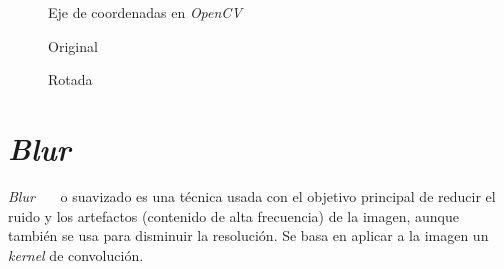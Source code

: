 \begin{figure}[H]
  \caption{Eje de coordenadas en \emph{OpenCV}}
  \centering \setlength\fboxsep{0pt} \setlength\fboxrule{0.5pt}
\end{figure}

\begin{figure}[H]
  \caption{Original}
  \centering \setlength\fboxsep{0pt} \setlength\fboxrule{0.5pt}
\end{figure}

\begin{figure}[H]
  \centering \setlength\fboxsep{0pt} \setlength\fboxrule{0.5pt}
  \caption{Rotada}
\end{figure}

\section{\emph{Blur}}
\emph{Blur}~\emph{\citep*[Smoothing]{opencv_book-bib}}~\emph{\citep*[3.3.1
  Non-linear filtering]{szeliski2010computer}}~\emph{\citep*[4.3 Noise
  Reduction]{toennies2012guide}} o suavizado es una técnica usada con
el objetivo principal de reducir el ruido y los artefactos (contenido
de alta frecuencia) de la imagen, aunque también se usa para disminuir
la resolución. Se basa en aplicar a la imagen un \emph{kernel} de
convolución.
